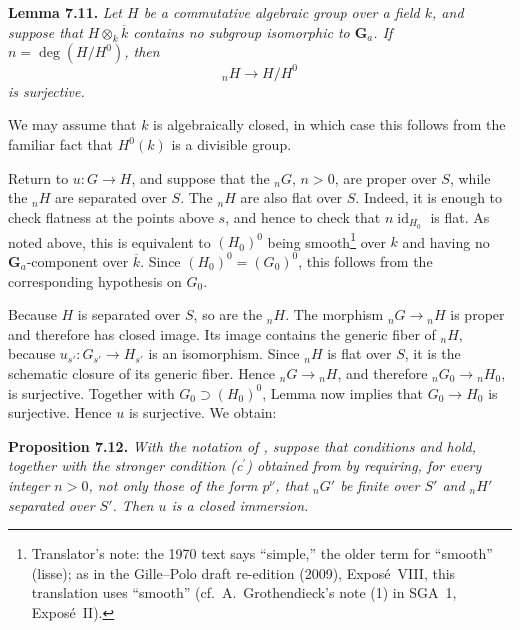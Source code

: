 \medskip
\noindent{}\textbf{Lemma 7.11.}
\textit{Let \(H\) be a commutative algebraic group over a field \(k\), and
suppose that \(H\otimes_k\overline{k}\) contains no subgroup isomorphic to
\(\mathbf G_a\). If \(n=\deg(H/H^0)\), then}
\[
  {}_nH\longrightarrow H/H^0
\]
\textit{is surjective.}

We may assume that \(k\) is algebraically closed, in which case this follows
from the familiar fact that \(H^0(k)\) is a divisible group.

Return to \(u:G\to H\), and suppose that the \({}_nG\), \(n>0\), are proper
over \(S\), while the \({}_nH\) are separated over \(S\). The \({}_nH\)
are also flat over \(S\). Indeed, it is enough to check flatness at the
points above \(s\), and hence to check that
\(n\operatorname{id}_{H_0}\) is flat. As noted above, this is equivalent to
\((H_0)^0\) being smooth\footnote{Translator's note: the 1970 text says ``simple,'' the older term
for ``smooth'' (lisse); as in the Gille--Polo draft re-edition (2009), Expos\'e~VIII, this
translation uses ``smooth'' (cf.\ A.~Grothendieck's note (1) in SGA~1, Expos\'e~II).} over \(k\)
and having no
\(\mathbf G_a\)-component over \(\overline{k}\). Since
\((H_0)^0=(G_0)^0\), this follows from the corresponding hypothesis on
\(G_0\).

Because \(H\) is separated over \(S\), so are the \({}_nH\). The morphism
\({}_nG\to{}_nH\) is proper and therefore has closed image. Its image
contains the generic fiber of \({}_nH\), because
\(u_{s'}:G_{s'}\to H_{s'}\) is an isomorphism. Since \({}_nH\) is flat
over \(S\), it is the schematic closure of its generic fiber. Hence
\({}_nG\to{}_nH\), and therefore \({}_nG_0\to{}_nH_0\), is surjective.
Together with \(G_0\supset(H_0)^0\), Lemma
 now implies that
\(G_0\to H_0\) is surjective. Hence \(u\) is surjective. We obtain:

\medskip
\noindent{}\textbf{Proposition 7.12.}
\textit{With the notation of , suppose that conditions  and  hold,
together with the stronger condition (c\(^{\prime}\)) obtained from  by
requiring, for every integer \(n>0\), not only those of the form \(p^\nu\),
that \({}_nG'\) be finite over \(S'\) and \({}_nH'\) separated over \(S'\).
Then \(u\) is a closed immersion.}

